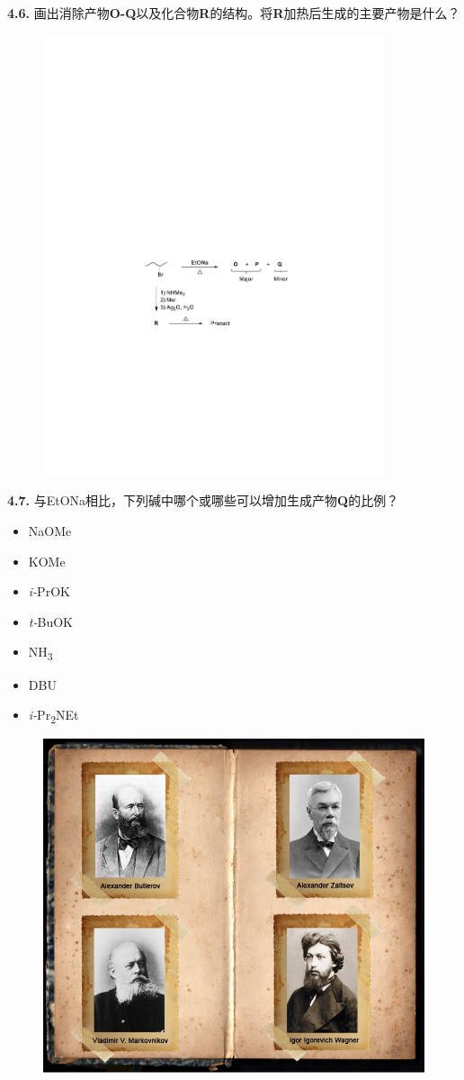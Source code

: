 \noindent\textbf{4.6.}
画出消除产物\textbf{O-Q}以及化合物\textbf{R}的结构。将\textbf{R}加热后生成的主要产物是什么？

\begin{figure}[h]
	\centering
	\includegraphics[width=10cm]{./pic/t4-6.pdf}
\end{figure}

\noindent\textbf{4.7.}
与EtONa相比，下列碱中哪个或哪些可以增加生成产物\textbf{Q}的比例？

\renewcommand{\labelitemi}{$\square$}
\begin{itemize}
	\item NaOMe
	\item KOMe
	\item \emph{i-}PrOK
	\item \emph{t-}BuOK
	\item NH\textsubscript{3}
	\item DBU
	\item \emph{i-}Pr\textsubscript{2}NEt
\end{itemize}
\renewcommand{\labelitemi}{$\bullet$}

\begin{figure}[h!]
	\centering
	\includegraphics[width=12cm]{./pic/t4-1.jpg}
\end{figure}
